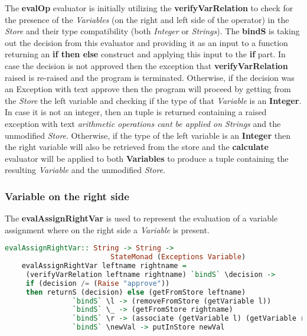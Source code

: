 \documentclass[a4paper, onecolumn]{article}
\begin{document}
    \noindent The \textbf{evalOp} evaluator is initially utilizing the \textbf{verifyVarRelation} to check for the presence of the \textit{Variables} (on the right and left side of the operator) in the \textit{Store} and their type compatibility (both \textit{Integer} or \textit{Strings}). The \textbf{bindS} is taking out the decision from this evaluator and providing it as an input to a function returning an \textbf{if then else} construct and applying this input to the \textbf{if} part. In case the decision is not approved then the exception that \textbf{verifyVarRelation} raised is re-raised and the program is terminated. Otherwise, if the decision was an Exception with text approve then the program will proceed by getting from the \textit{Store} the left variable and checking if the type of that \textit{Variable} is an \textbf{Integer}. In case it is not an integer, then an tuple is returned containing a raised exception with text \textit{arithmetic operations cant be applied on Strings} and the unmodified \textit{Store}. Otherwise, if the type of the left variable is an \textbf{Integer} then the right variable will also be retrieved from the store and the \textbf{calculate} evaluator will be applied to both \textbf{Variables} to produce a tuple containing the resulting \textit{Variable} and the unmodified \textit{Store}.   
    
    
    \subsubsection{Variable on the right side}
    
    The \textbf{evalAssignRightVar} is used to represent the evaluation of a variable assignment where on the right side a \textit{Variable} is present.
    
    \begin{tcolorbox}
    \begin{lstlisting}[language=Haskell] 
    evalAssignRightVar:: String -> String ->
                         StateMonad (Exceptions Variable)
    evalAssignRightVar leftname rightname = 
     (verifyVarRelation leftname rightname) `bindS` \decision -> 
     if (decision /= (Raise "approve")) 
     then returnS (decision) else (getFromStore leftname) 
                `bindS` \l -> (removeFromStore (getVariable l)) 
                `bindS` \_ -> (getFromStore rightname) 
                `bindS` \r -> (associate (getVariable l) (getVariable r)) 
                `bindS` \newVal -> putInStore newVal
    \end{lstlisting}
    \end{tcolorbox}
    
\end{document}
